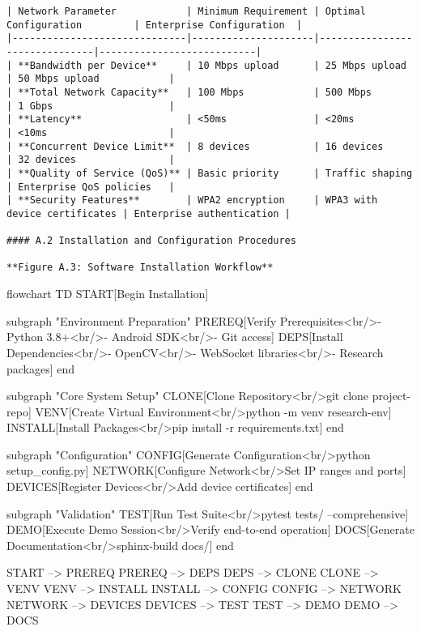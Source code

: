 \documentclass[12pt,a4paper]{report}
\begin{document}
\begin{itemize}
\begin{verbatim}
| Network Parameter            | Minimum Requirement | Optimal Configuration         | Enterprise Configuration  |
|------------------------------|---------------------|-------------------------------|---------------------------|
| **Bandwidth per Device**     | 10 Mbps upload      | 25 Mbps upload                | 50 Mbps upload            |
| **Total Network Capacity**   | 100 Mbps            | 500 Mbps                      | 1 Gbps                    |
| **Latency**                  | <50ms               | <20ms                         | <10ms                     |
| **Concurrent Device Limit**  | 8 devices           | 16 devices                    | 32 devices                |
| **Quality of Service (QoS)** | Basic priority      | Traffic shaping               | Enterprise QoS policies   |
| **Security Features**        | WPA2 encryption     | WPA3 with device certificates | Enterprise authentication |

#### A.2 Installation and Configuration Procedures

**Figure A.3: Software Installation Workflow**

\end{verbatim}
\end{itemize}
flowchart TD
    START[Begin Installation]

    subgraph "Environment Preparation"
        PREREQ[Verify Prerequisites<br/>- Python 3.8+<br/>- Android SDK<br/>- Git access]
        DEPS[Install Dependencies<br/>- OpenCV<br/>- WebSocket libraries<br/>- Research packages]
    end

    subgraph "Core System Setup"
        CLONE[Clone Repository<br/>git clone project-repo]
        VENV[Create Virtual Environment<br/>python -m venv research-env]
        INSTALL[Install Packages<br/>pip install -r requirements.txt]
    end

    subgraph "Configuration"
        CONFIG[Generate Configuration<br/>python setup\_config.py]
        NETWORK[Configure Network<br/>Set IP ranges and ports]
        DEVICES[Register Devices<br/>Add device certificates]
    end

subgraph "Validation"
TEST[Run Test Suite<br/>pytest tests/ --comprehensive]
DEMO[Execute Demo Session<br/>Verify end-to-end operation]
DOCS[Generate Documentation<br/>sphinx-build docs/]
end

START --> PREREQ
PREREQ --> DEPS
DEPS --> CLONE
CLONE --> VENV
VENV --> INSTALL
INSTALL --> CONFIG
CONFIG --> NETWORK
NETWORK --> DEVICES
DEVICES --> TEST
TEST --> DEMO
DEMO --> DOCS
\end{document}
